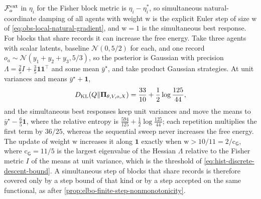 $\mathcal F^{\mathrm{ext}}_o$ in $\eta_i$ for the Fisher block metric is
$\eta_i-\eta_i^*$, so simultaneous natural-coordinate damping of all agents with
weight $\mathrm w$ is the explicit Euler step of size $\mathrm w$ of
\eqref{eq:obs-local-natural-gradient}, and $\mathrm w=1$ is the simultaneous best
response. For blocks that share records it can increase the free energy. Take three
agents with scalar latents, baseline $\mathcal N(0,5/2)$ for each, and one record
$o_a\sim\mathcal N(y_1+y_2+y_3,5/3)$, so the posterior is Gaussian with precision
$\Lambda=\tfrac25I+\tfrac35\mathbf 1\mathbf 1^\top$ and some mean $\bar y^\star$, and
take product Gaussian strategies. At unit variances and means $\bar y^\star+\mathbf 1$,
\begin{equation}
D_{\mathrm{KL}}(Q\Vert\boldsymbol\Pi_{\theta,V,o,X})=\frac{33}{10}+\frac12\log\frac{125}{44},
\label{eq:obs-simultaneous-witness}
\end{equation}
and the simultaneous best responses keep unit variances and move the means to
$\bar y^\star-\tfrac65\mathbf 1$, where the relative entropy is
$\tfrac{594}{125}+\tfrac12\log\tfrac{125}{44}$; each repetition multiplies the
first term by $36/25$, whereas the sequential sweep never increases the free energy.
The update of weight $\mathrm w$ increases it along $\mathbf 1$ exactly when
$\mathrm w>10/11=2/\mathrm c_{\mathsf G}$, where $\mathrm c_{\mathsf G}=11/5$ is the
largest eigenvalue of the Hessian $\Lambda$ relative to the Fisher metric $I$ of the
means at unit variance, which is the threshold of
\eqref{eq:hist-discrete-descent-bound}. A simultaneous step of blocks that share
records is therefore covered only by a step bound of that kind or by a step
accepted on the same functional, as after
\cref{prop:elbo-finite-step-nonmonotonicity}. 

